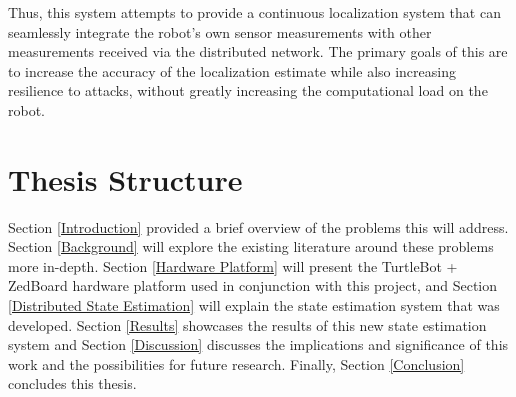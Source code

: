 \documentclass[thesis.tex]{subfile}
\begin{document}
Thus, this system attempts to provide a continuous localization system that can seamlessly integrate the robot's own sensor measurements with other measurements received via the distributed network. The primary goals of this are to increase the accuracy of the localization estimate while also increasing resilience to attacks, without greatly increasing the computational load on the robot.

\section{Thesis Structure} \label{Thesis Structure}
Section \ref{Introduction} provided a brief overview of the problems this will address. Section \ref{Background} will explore the existing literature around these problems more in-depth. Section \ref{Hardware Platform} will present the TurtleBot + ZedBoard hardware platform used in conjunction with this project, and Section \ref{Distributed State Estimation} will explain the state estimation system that was developed. Section \ref{Results} showcases the results of this new state estimation system and Section \ref{Discussion} discusses the implications and significance of this work and the possibilities for future research. Finally, Section \ref{Conclusion} concludes this thesis.
\end{document}
